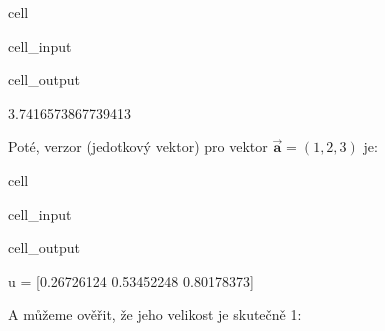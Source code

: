 \documentclass[letterpaper,10pt,english]{jupyterBook}
\begin{document}
\begin{sphinxuseclass}{cell}\begin{sphinxVerbatimInput}

\begin{sphinxuseclass}{cell_input}
\begin{sphinxVerbatim}[commandchars=\\\{\}]
\end{sphinxVerbatim}

\end{sphinxuseclass}\end{sphinxVerbatimInput}
\begin{sphinxVerbatimOutput}

\begin{sphinxuseclass}{cell_output}
\begin{sphinxVerbatim}[commandchars=\\\{\}]
3.7416573867739413
\end{sphinxVerbatim}

\end{sphinxuseclass}\end{sphinxVerbatimOutput}

\end{sphinxuseclass}
\sphinxAtStartPar
Poté, verzor (jedotkový vektor) pro vektor \( \overrightarrow{\mathbf{a}} = (1, 2, 3)\) je:

\begin{sphinxuseclass}{cell}\begin{sphinxVerbatimInput}

\begin{sphinxuseclass}{cell_input}
\begin{sphinxVerbatim}[commandchars=\\\{\}]
  \PYG{p}{[}  \PYG{p}{]}
  
 
\end{sphinxVerbatim}

\end{sphinxuseclass}\end{sphinxVerbatimInput}
\begin{sphinxVerbatimOutput}

\begin{sphinxuseclass}{cell_output}
\begin{sphinxVerbatim}[commandchars=\\\{\}]
u = [0.26726124 0.53452248 0.80178373]
\end{sphinxVerbatim}

\end{sphinxuseclass}\end{sphinxVerbatimOutput}

\end{sphinxuseclass}
\sphinxAtStartPar
A můžeme ověřit, že jeho velikost je skutečně 1:
\end{document}

